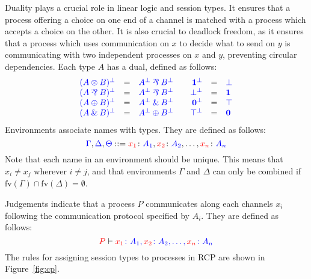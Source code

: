 \documentclass[a4paper,UKenglish]{lipics-v2016}
\begin{document}
Duality plays a crucial role in linear logic and session types. It ensures that
a process offering a choice on one end of a channel is matched with a process
which accepts a choice on the other. It is also crucial to deadlock freedom, as
it ensures that a process which uses communication on $x$ to decide what to send
on $y$ is communicating with two independent processes on $x$ and $y$,
preventing circular dependencies. Each type $A$ has a dual, defined as follows:
\[
  \begin{array}{rclcrcl}
    \tm{( A \tens B )^\bot} &=& \tm{A^\bot \parr B^\bot}&&
    \tm{\one^\bot}          &=& \tm{\bot}\\
    \tm{( A \parr B )^\bot} &=& \tm{A^\bot \parr B^\bot}&&
    \tm{\bot^\bot}          &=& \tm{\one}\\
    \tm{( A \plus B )^\bot} &=& \tm{A^\bot \with B^\bot}&&
    \tm{\nil^\bot}          &=& \tm{\top}\\
    \tm{( A \with B )^\bot} &=& \tm{A^\bot \plus B^\bot}&&
    \tm{\top^\bot}          &=& \tm{\nil}
  \end{array}
\]
Environments associate names with types. They are defined as follows:
\[
  \blue{\Gamma},\blue{\Delta},\blue{\Theta} ::=
  \tm[x_1]{A_1},\tm[x_2]{A_2},\dots,\tm[x_n]{A_n}
\]
Note that each name in an environment should be unique. This means that $x_i
\neq x_j$ wherever $i \neq j$, and that environments $\Gamma$ and $\Delta$ can
only be combined if $\text{fv}(\Gamma) \cap \text{fv}(\Delta) = \emptyset$.

Judgements indicate that a process $P$ communicates along each channels $x_i$
following the communication protocol specified by $A_i$. They are defined as
follows:
\[
  \seq[{ P }]{ \tm[x_1]{A_1},\tm[x_2]{A_2},\dots,\tm[x_n]{A_n} }
\]
The rules for assigning session types to processes in RCP are shown in
Figure~\ref{fig:cp}.


\end{document}
